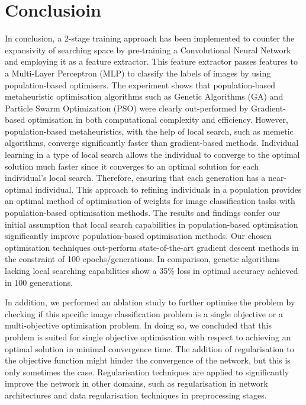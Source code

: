 \documentclass[conference]{IEEEtran}
\begin{document}
\section{Conclusioin}
In conclusion, a 2-stage training approach has been implemented to counter the expansivity of searching space by pre-training a Convolutional Neural Network and employing it as a feature extractor. This feature extractor passes features to a Multi-Layer Perceptron (MLP) to classify the labels of images by using population-based optimisers. The experiment shows that population-based metaheuristic optimisation algorithms such as Genetic Algorithms (GA) and Particle Swarm Optimization (PSO) were clearly out-performed by Gradient-based optimisation in both computational complexity and efficiency. However, population-based metaheuristics, with the help of local search, such as memetic algorithms, converge significantly faster than gradient-based methods. Individual learning in a type of local search allows the individual to converge to the optimal solution much faster since it converges to an optimal solution for each individual's local search. Therefore, ensuring that each generation has a near-optimal individual. This approach to refining individuals in a population provides an optimal method of optimisation of weights for image classification tasks with population-based optimisation methods. The results and findings confer our initial assumption that local search capabilities in population-based optimisation significantly improve population-based optimisation methods. Our chosen optimisation techniques out-perform state-of-the-art gradient descent methods in the constraint of 100 epochs/generations. In comparison, genetic algorithms lacking local searching capabilities show a 35\% loss in optimal accuracy achieved in 100 generations. 
\par
In addition, we performed an ablation study to further optimise the problem by checking if this specific image classification problem is a single objective or a multi-objective optimisation problem. In doing so, we concluded that this problem is suited for single objective optimisation with respect to achieving an optimal solution in minimal convergence time. The addition of regularisation to the objective function might hinder the convergence of the network, but this is only sometimes the case. Regularisation techniques are applied to significantly improve the network in other domains, such as regularisation in network architectures and data regularisation techniques in preprocessing stages. 
\par
\end{document}
